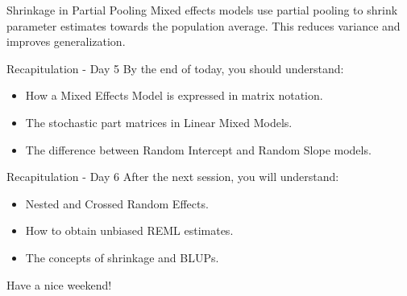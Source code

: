 \documentclass{beamer}
\begin{document}
\begin{frame}{Shrinkage in Partial Pooling}
Mixed effects models use partial pooling to shrink parameter estimates towards the population average. This reduces variance and improves generalization.
\end{frame}

\begin{frame}{Recapitulation - Day 5}
By the end of today, you should understand:
\begin{itemize}
  \item How a Mixed Effects Model is expressed in matrix notation.
  \item The stochastic part matrices in Linear Mixed Models.
  \item The difference between Random Intercept and Random Slope models.
\end{itemize}
\end{frame}

\begin{frame}{Recapitulation - Day 6}
After the next session, you will understand:
\begin{itemize}
  \item Nested and Crossed Random Effects.
  \item How to obtain unbiased REML estimates.
  \item The concepts of shrinkage and BLUPs.
\end{itemize}
Have a nice weekend!
\end{frame}
\end{document}
